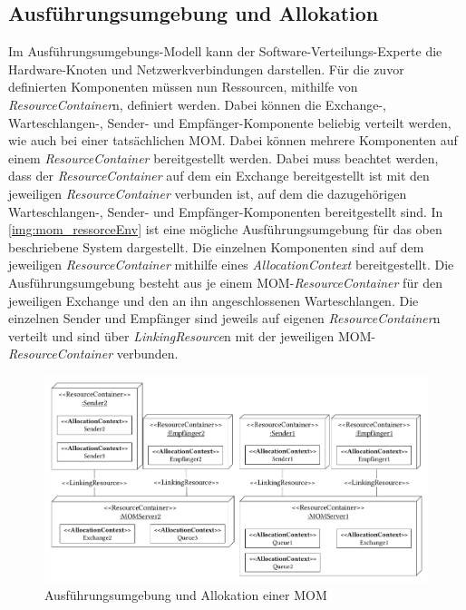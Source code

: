 \subsection{Ausführungsumgebung und Allokation}
Im Ausführungsumgebungs-Modell kann der Software-Verteilungs-Experte die Hardware-Knoten und Netzwerkverbindungen darstellen. Für die zuvor definierten Komponenten müssen nun Ressourcen, mithilfe von \emph{ResourceContainer}n, definiert werden. Dabei können die Exchange-, Warteschlangen-, Sender- und Empfänger-Komponente beliebig verteilt werden, wie auch bei einer tatsächlichen MOM. Dabei können mehrere Komponenten auf einem \emph{ResourceContainer} bereitgestellt werden. Dabei muss beachtet werden, dass der \emph{ResourceContainer} auf dem ein Exchange bereitgestellt ist mit den jeweiligen \emph{ResourceContainer} verbunden ist, auf dem die dazugehörigen Warteschlangen-, Sender- und Empfänger-Komponenten bereitgestellt sind. In \autoref{img:mom_ressorceEnv} ist eine mögliche Ausführungsumgebung für das oben beschriebene System dargestellt. Die einzelnen Komponenten sind auf dem jeweiligen \emph{ResourceContainer} mithilfe eines \emph{AllocationContext} bereitgestellt. Die Ausführungsumgebung besteht aus je einem MOM-\emph{ResourceContainer} für den jeweiligen Exchange und den an ihn angeschlossenen Warteschlangen. Die einzelnen Sender und Empfänger sind jeweils auf eigenen \emph{ResourceContainer}n verteilt und sind über \emph{LinkingResource}n mit der jeweiligen MOM-\emph{ResourceContainer} verbunden. 
\begin{figure}
\center
  \includegraphics[width=1\textwidth]{images/modelling/modelingRecEnv.pdf}
  \caption{Ausführungsumgebung und Allokation einer MOM}
  \label{img:mom_ressorceEnv}
\end{figure}

